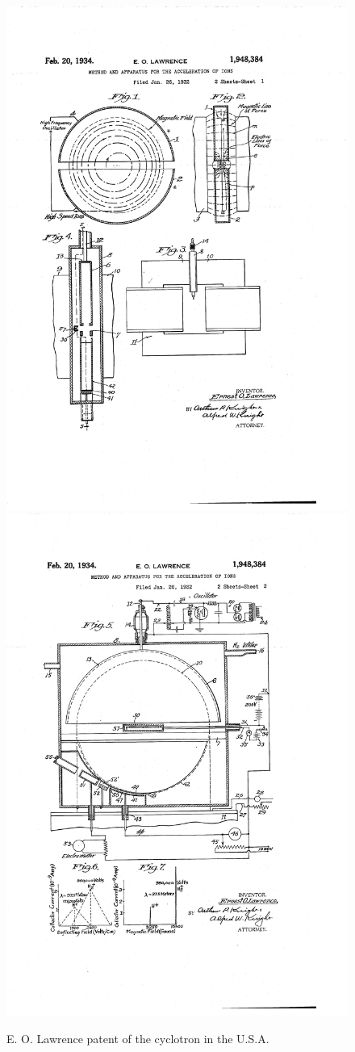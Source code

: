 \begin{figure}
 \centering
  \begin{minipage}{\textwidth}
  \centering
   \includegraphics[width=.49\textwidth]{Pictures/cyclo1.png}
   \includegraphics[width=.49\textwidth]{Pictures/cyclo2.png}
  	\caption{\label{fig:cyclo}
                  E. O. Lawrence patent of the cyclotron in the U.S.A.}
  \end{minipage}
\end{figure}

